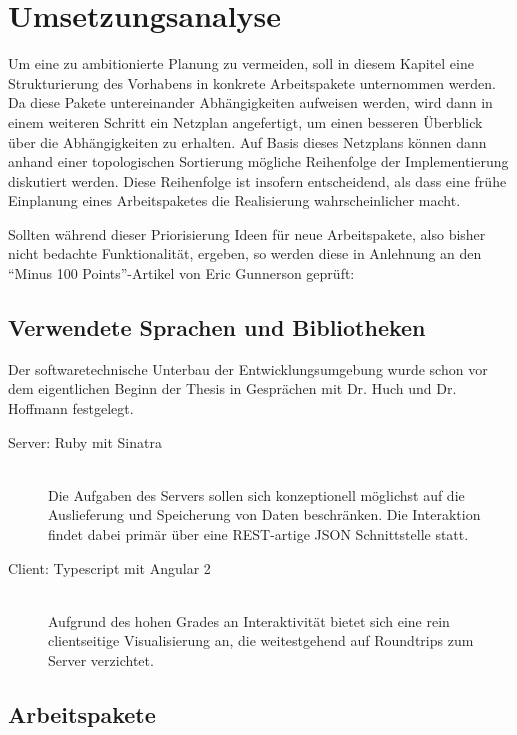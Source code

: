\section{Umsetzungsanalyse}
\label{sec:implementation-analysis}


Um eine zu ambitionierte Planung zu vermeiden, soll in diesem Kapitel eine Strukturierung des Vorhabens in konkrete Arbeitspakete unternommen werden. Da diese Pakete untereinander Abhängigkeiten aufweisen werden, wird dann in einem weiteren Schritt ein Netzplan angefertigt, um einen besseren Überblick über die Abhängigkeiten zu erhalten. Auf Basis dieses Netzplans können dann anhand einer topologischen Sortierung mögliche Reihenfolge der Implementierung diskutiert werden. Diese Reihenfolge ist insofern entscheidend, als dass eine frühe Einplanung eines Arbeitspaketes die Realisierung wahrscheinlicher macht.

Sollten während dieser Priorisierung Ideen für neue Arbeitspakete, also bisher nicht bedachte Funktionalität, ergeben, so werden diese in Anlehnung an den ``Minus 100 Points''-Artikel von Eric Gunnerson\cite{gunnerson-minus-100} geprüft:

\subsection{Verwendete Sprachen und Bibliotheken}

Der softwaretechnische Unterbau der Entwicklungsumgebung wurde schon vor dem eigentlichen Beginn der Thesis in Gesprächen mit Dr. Huch und Dr. Hoffmann festgelegt.

\begin{description}
\item[Server: Ruby mit Sinatra] \hfill\\
  Die Aufgaben des Servers sollen sich konzeptionell möglichst auf die Auslieferung und Speicherung von Daten beschränken. Die Interaktion findet dabei primär über eine REST-artige JSON Schnittstelle statt.
\item[Client: Typescript mit Angular 2] \hfill\\
  Aufgrund des hohen Grades an Interaktivität bietet sich eine rein clientseitige Visualisierung an, die weitestgehend auf Roundtrips zum Server verzichtet.
\end{description}

\subsection{Arbeitspakete}

